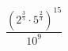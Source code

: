 \begin{ex}[type=calculate]
	\begin{condition}
		\( \dfrac{(2^{\frac{3}{5}}\cdot5^{\frac{2}{3}})^{15}}{10^9} \)
	\end{condition}
\end{ex}